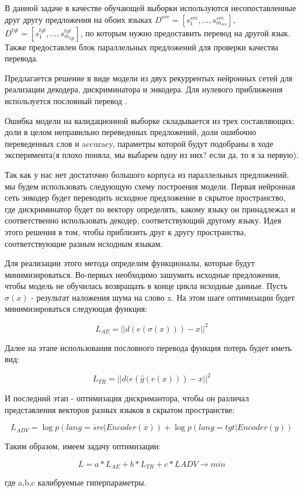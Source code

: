 \documentclass[12pt,twoside]{article}
\begin{document}
В данной задаче в качестве обучающей выборки используются несопоставленные друг другу предложения на обоих языках $D^{src} = [s_1^{src},...,s_{m_{src}}^{src}]$, $D^{tgt} = [s_1^{tgt},...,s_{m_{tgt}}^{tgt}]$, по которым нужно предоставить перевод на другой язык. Также предоставлен блок параллельных предложений для проверки качества перевода.

Предлагается решение в виде модели из двух рекуррентых нейронных сетей для реализации декодера, дискриминатора и энкодера. Для нулевого приближения используется пословный перевод \cite{conneau2017word}.

Ошибка модели на валидационной выборке складывается из трех составляющих: доли в целом неправильно переведнных предложений, доли ошибочно переведенных слов и accuracy, параметры которой будут подобраны в ходе эксперимента(я плохо поняла, мы выбарем одну из них? если да, то я за первую).

Так как у нас нет достаточно большого корпуса из параллельных предложений, мы будем использовать следующую схему построения модели. Первая нейронная сеть энкодер будет переводить исходное предложение в скрытое пространство, где дискриминатор будет по вектору определять, какому языку он принадлежал и соответственно использовать декодер, соответствующий другому языку. Идея этого решения в том, чтобы приблизить друг к другу пространства, соответствующие разным исходным языкам.

Для реализации этого метода определим функционалы, которые будут минимизироваться. Во-первых необходимо зашумить исходные предложения, чтобы модель не обучилась возвращать в конце цикла исходные данные. Пусть $\sigma(x)$ - результат наложения шума на слово x. На этом шаге оптимизации будет минимизироваться следующая функция:

$$L_{AE} = ||d(e(\sigma(x)))-x||^2$$

Далее на этапе использования пословного перевода функция потерь будет иметь вид:

$$L_{TR} = ||d(e(\hat{g}(e(x))) - x||^2$$

И последний этап - оптимизация дискримантора, чтобы он различал представления векторов разных языков в скрытом пространстве:

$$L_{ADV} = \log p(lang = src| Encoder(x)) + \log p(lang = tgt|Encoder(y))$$

Таким образом, имеем задачу оптимизации:

$$L = a*L_{AE} + b*L_{TR}+c*L{ADV} \longrightarrow min$$

где a,b,c калибруемые гиперпараметры.






\end{document}
